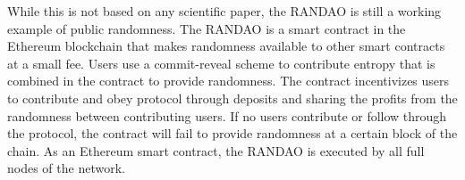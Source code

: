 While this is not based on any scientific paper, the RANDAO \cite{randao} is still a working example of public randomness. The RANDAO is a smart contract in the Ethereum blockchain that makes randomness available to other smart contracts at a small fee. Users use a commit-reveal scheme to contribute entropy that is combined in the contract to provide randomness. The contract incentivizes users to contribute and obey protocol through deposits and sharing the profits from the randomness between contributing users. If no users contribute or follow through the protocol, the contract will fail to provide randomness at a certain block of the chain. As an Ethereum smart contract, the RANDAO is executed by all full nodes of the network. 